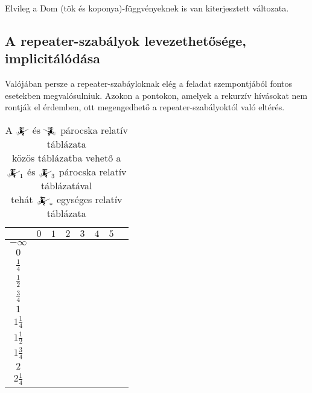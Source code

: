 \documentclass{article}
\newcommand{\blk}{\cellcolor{darkgray}}
\newcommand{\red}{\cellcolor{red!33}}
\newcommand{\grn}{\cellcolor{green!33}}
\newcommand{\nothing}{\text{\raisebox{0.4em}{\rotatebox{180}{$\curvearrowleft$}}}}%
\newcommand{\just}[1]{\boxed{#1}}%
\newcommand{\incl}{\mathbf{incl}}
\newcommand{\excl}{\mathbf{excl}}
\newcommand{\currymainfun}[1]{\mathwitch_{#1}}
\newcommand{\currymainfunA}{\mathwitch}
\newcommand{\currymainfunB}{\reversemathwitch}
\begin{document}
	Elvileg a Dom (tök és koponya)-függvényeknek is van kiterjesztett változata.

	\subsection{A repeater-szabályok levezethetősége, implicitálódása}

	Valójában persze a repeater-szabáyloknak elég a feladat szempontjából fontos esetekben megvalósulniuk. Azokon a pontokon, amelyek a rekurzív hívásokat nem rontják el érdemben, ott megengedhető a repeater-szabályoktól való eltérés.

	\begin{table}[H]
		\caption*{A $\currymainfunA$ és $\currymainfunB$ párocska relatív táblázata\\közös táblázatba vehető a $\currymainfun1$ és $\currymainfun3$ párocska relatív táblázatával\\tehát $\currymainfun{*}$ egységes relatív táblázata}
		\centering
		\begin{tabular}{c||c|c|c|c|c|c|c|}
				&	$0$		&	$1$		&	$2$		&	$3$		&	$4$		&	$5$		\\\hline\hline
		$-\infty$	&	\nothing	&	\nothing	&	\nothing	&	\nothing	&	\nothing	&	\nothing	\\\hline
			$0$	&	\nothing	&	\nothing	&	\nothing	&	\nothing	&	\nothing	&	\grn\just\incl	\\\hline
		$\frac14$	&	\nothing	&	\nothing	&	\nothing	&	\nothing	&	\nothing	&	\grn\just\incl	\\\hline
		$\frac12$	&	\red\just\excl	&	\nothing	&	\nothing	&	\nothing	&	\nothing	&	\grn\just\incl	\\\hline
		$\frac34$	&	\red\just\excl	&	\nothing	&	\nothing	&	\nothing	&	\nothing	&	\grn\just\incl	\\\hline
			$1$	&	\red\just\excl	&	\nothing	&	\nothing	&	\nothing	&	\grn\just\incl	&	\blk		\\\hline
		$1\frac14$	&	\red\just\excl	&	\nothing	&	\nothing	&	\nothing	&	\grn\just\incl	&	\blk		\\\hline
		$1\frac12$	&	\blk		&	\red\just\excl	&	\nothing	&	\nothing	&	\grn\just\incl	&	\blk		\\\hline
		$1\frac34$	&	\blk		&	\red\just\excl	&	\nothing	&	\nothing	&	\grn\just\incl	&	\blk		\\\hline
			$2$	&	\blk		&	\red\just\excl	&	\nothing	&	\grn\just\incl	&	\blk		&	\blk		\\\hline
		$2\frac14$	&	\blk		&	\red\just\excl	&	\nothing	&	\grn\just\incl	&	\blk		&	\blk		\\\hline

\end{tabular}
\end{table}
\end{document}
